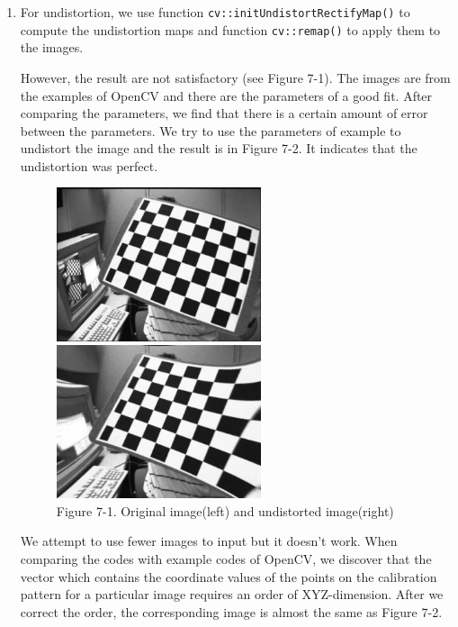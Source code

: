 \documentclass{article}
\begin{document}
\begin{enumerate}
\item For undistortion, we use function \verb|cv::initUndistortRectifyMap()| to compute the undistortion maps and function \verb|cv::remap()| to apply them to the images.

However, the result are not satisfactory (see Figure 7-1). The images are from the examples of OpenCV and there are the parameters of a good fit. After comparing the parameters, we find that there is a certain amount of error between the parameters. We try to use the parameters of example to undistort the image and the result is in Figure 7-2. It indicates that the undistortion was perfect. 

\begin{figure}[h]
\centering
\begin{minipage}[]{0.45\textwidth}
\centering
\includegraphics[width=6cm]{7-1l}
\end{minipage}
\begin{minipage}[]{0.45\textwidth}
\centering
\includegraphics[width=6cm]{7-1r}
\end{minipage}
\caption*{Figure 7-1. Original image(left) and undistorted image(right)}
\end{figure}

We attempt to use fewer images to input but it doesn't work. When comparing the codes with example codes of OpenCV, we discover that the vector which contains the coordinate values of the points on the calibration pattern for a particular image requires an order of XYZ-dimension. After we correct the order, the corresponding image is almost the same as Figure 7-2.


\end{enumerate}
\end{document}
